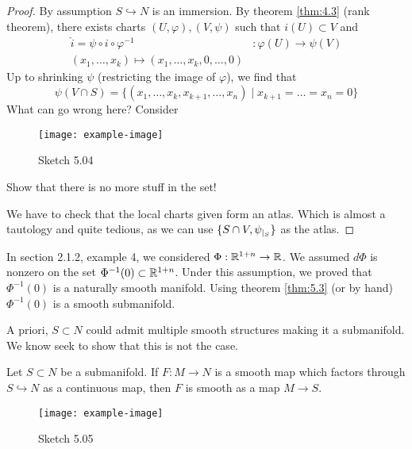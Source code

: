 \begin{proof}
     By assumption \(S\hookrightarrow N\) is an immersion. 
    By theorem \ref{thm:4.3} (rank theorem), there exists charts \((U,\varphi),(V,\psi)\) such that \(i(U)\subset V\)
    and 
    \begin{align*}
        \hat{i}=\psi\circ i\circ \varphi^{-1}&:\varphi(U)\to\psi(V)\\
        (x_1,\dots,x_k)\mapsto (x_1,\dots,x_k,0,\dots,0)
    \end{align*}
    Up to shrinking \(\psi\) (restricting the image of \(\varphi\)), we find that 
    \[\psi(V\cap S)=\{(x_1,\dots,x_k,x_{k+1},\dots,x_n)\mid x_{k+1}=\dots=x_{n}=0\}\]
     What can go wrong here? Consider 
    \begin{figure}[H]
        \centering
        \texttt{[image: example-image]}
        \caption{Sketch 5.04}
    \end{figure}
    Show that there is no more stuff in the set! %

     We have to check that the local charts given form an atlas. Which is almost a tautology and quite tedious, as we can use \(\{S\cap V,\psi_{|_{S}}\}\) as the atlas.
\end{proof}

\begin{remark}[+Exercise]
    In section 2.1.2, example 4, we considered %
    \(\Phi:\mathbb{R}^{1+n}\to\mathbb{R}\). We assumed \(d\Phi\) is nonzero on 
    the set \(\Phi^{-1}(0)\subset\mathbb{R}^{1+n}\). Under this assumption, we proved 
    that \(\Phi^{-1}(0)\) is a naturally smooth manifold. Using theorem \ref{thm:5.3} (or by hand) 
    \(\Phi^{-1}(0)\) is a smooth submanifold.
\end{remark}

A priori, \(S\subset N\) could admit multiple smooth structures making it a submanifold. We know 
    seek to show that this is not the case.

\begin{lemma}\label{lem:5.4}
    Let \(S\subset N\) be a submanifold. If \(F:M\to N\) is a smooth map which factors through 
    \(S\hookrightarrow N\) as a continuous map, then \(F\) is smooth as a map \(M\to S\). 
    \begin{figure}[H]
        \centering
        \texttt{[image: example-image]}
        \caption{Sketch 5.05}
    \end{figure}
\end{lemma}

